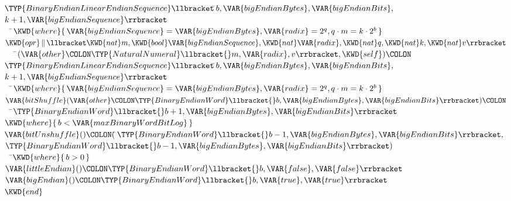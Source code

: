 \begin{Fortress}
\(     \TYP{BinaryEndianLinearEndianSequence}\llbracket\null\)\pushtabs\=\+\(b,\VAR{bigEndianBytes},\VAR{bigEndianBits},\)\\
\(                                       k+1,\VAR{bigEndianSequence}\rrbracket\)\-\-\\\poptabs\poptabs
{\tt~~}\pushtabs\=\+\(    \KWD{where} \{\,\VAR{bigEndianSequence} = \VAR{bigEndianBytes}, \VAR{radix} = 2^{q}, q \cdot m = k \cdot 2^{b}\,\}\)\-\\\poptabs
\(  \KWD{opr}\,\|\,\llbracket\KWD{nat} m,\KWD{bool} \VAR{bigEndianSequence},\KWD{nat} \VAR{radix},\KWD{nat} q,\KWD{nat} k,\KWD{nat} v\rrbracket\)\\
{\tt~~~}\pushtabs\=\+\(     (\VAR{other}\COLON \TYP{NaturalNumeral}\llbracket{}m,\VAR{radix},v\rrbracket, \KWD{self})\COLON \)\\
\(     \TYP{BinaryEndianLinearEndianSequence}\llbracket\null\)\pushtabs\=\+\(b,\VAR{bigEndianBytes},\VAR{bigEndianBits},\)\\
\(                                       k+1,\VAR{bigEndianSequence}\rrbracket\)\-\-\\\poptabs\poptabs
{\tt~~}\pushtabs\=\+\(    \KWD{where} \{\,\VAR{bigEndianSequence} = \VAR{bigEndianBytes}, \VAR{radix} = 2^{q}, q \cdot m = k \cdot 2^{b}\,\}\)\-\\\poptabs
\(  \VAR{bitShuffle}(\VAR{other}\COLON \TYP{BinaryEndianWord}\llbracket{}b,\VAR{bigEndianBytes},\VAR{bigEndianBits}\rrbracket)\COLON \)\\
{\tt~~}\pushtabs\=\+\(    \TYP{BinaryEndianWord}\llbracket{}b+1,\VAR{bigEndianBytes},\VAR{bigEndianBits}\rrbracket\)\\
\(    \KWD{where} \{\,b < \VAR{maxBinaryWordBitLog}\,\}\)\-\\\poptabs
\(  \VAR{bitUnshuffle}()\COLON (\null\)\pushtabs\=\+\(\TYP{BinaryEndianWord}\llbracket{}b-1,\VAR{bigEndianBytes},\VAR{bigEndianBits}\rrbracket,\)\\
\(                   \TYP{BinaryEndianWord}\llbracket{}b-1,\VAR{bigEndianBytes},\VAR{bigEndianBits}\rrbracket)\)\-\\\poptabs
{\tt~~}\pushtabs\=\+\(    \KWD{where} \{\,b > 0\,\}\)\-\\\poptabs
\(  \VAR{littleEndian}()\COLON \TYP{BinaryEndianWord}\llbracket{}b,\VAR{false},\VAR{false}\rrbracket\)\\
\(  \VAR{bigEndian}()\COLON \TYP{BinaryEndianWord}\llbracket{}b,\VAR{true},\VAR{true}\rrbracket\)\-\\\poptabs
\(\KWD{end}\)
\end{Fortress}


